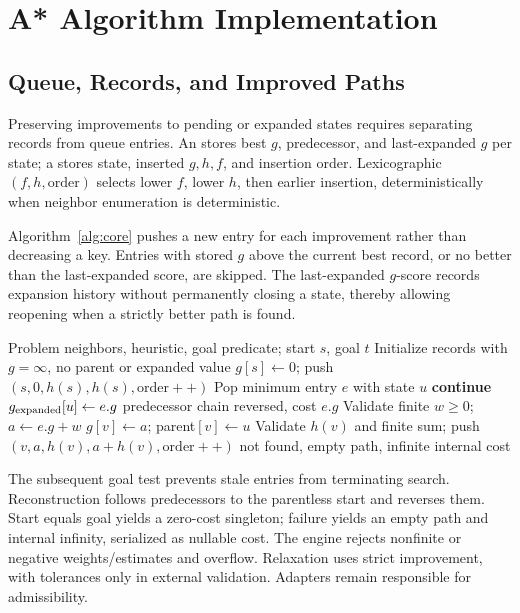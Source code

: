 \section{A* Algorithm Implementation}
\subsection{Queue, Records, and Improved Paths}
Preserving improvements to pending or expanded states requires separating records from queue entries. An  stores best $g$, predecessor, and last-expanded $g$ per state; a  stores state, inserted $g,h,f$, and insertion order. Lexicographic $(f,h,\mathrm{order})$ selects lower $f$, lower $h$, then earlier insertion, deterministically when neighbor enumeration is deterministic.

Algorithm~\ref{alg:core} pushes a new entry for each improvement rather than decreasing a key. Entries with stored $g$ above the current best record, or no better than the last-expanded score, are skipped. The last-expanded $g$-score records expansion history without permanently closing a state, thereby allowing reopening when a strictly better path is found.

\begin{algorithm}[H]
\caption{Shared C++ search (trace and counters omitted)}\label{alg:core}
\begin{algorithmic}[1]
\Require Problem neighbors, heuristic, goal predicate; start $s$, goal $t$
\State Initialize records with $g=\infty$, no parent or expanded value
\State $g[s]\gets0$; push $(s,0,h(s),h(s),\mathrm{order}{+}{+})$
  \State Pop minimum entry $e$ with state $u$
    \State \textbf{continue}
  \EndIf
  \State $g_{\rm expanded}[u]\gets e.g$
    \State \Return predecessor chain reversed, cost $e.g$
  \EndIf
    \State Validate finite $w\geq0$; $a\gets e.g+w$
      \State $g[v]\gets a$; parent$[v]\gets u$
      \State Validate $h(v)$ and finite sum; push $(v,a,h(v),a+h(v),\mathrm{order}{+}{+})$
    \EndIf
  \EndFor
\EndWhile
\State \Return not found, empty path, infinite internal cost
\end{algorithmic}
\end{algorithm}

The subsequent goal test prevents stale entries from terminating search. Reconstruction follows predecessors to the parentless start and reverses them. Start equals goal yields a zero-cost singleton; failure yields an empty path and internal infinity, serialized as nullable cost. The engine rejects nonfinite or negative weights/estimates and overflow. Relaxation uses strict improvement, with tolerances only in external validation. Adapters remain responsible for admissibility.

